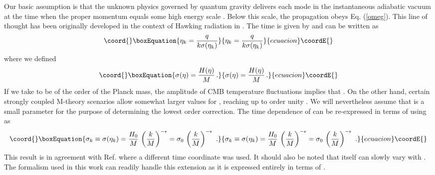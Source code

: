 \documentclass[a4paper,aps,prd,preprint,groupedaddress,nofootinbib]{revtex4}
\begin{document}
Our basic assumption is that the unknown physics governed by quantum gravity
delivers each mode \coordHE{} in the instantaneous
adiabatic vacuum at the time \coordHE{} when the proper momentum \coordHE{} 
equals some high energy scale \coordHE{}. Below this scale, the 
propagation obeys Eq. (\ref{omeg}). This line of thought has been
originally developed in the context of Hawking radiation in \cite{J93}. 
The time \coordHE{} is given by \coordHE{} and can be written as
\begin{equation}\coord{}\boxEquation{
\eta_k = \frac{q}{k \sigma(\eta_k)}
}{
\eta_k = \frac{q}{k \sigma(\eta_k)}
}{ecuacion}\coordE{}\end{equation}
where we defined
\begin{equation}\coord{}\boxEquation{
\label{sigmadef}
\sigma(\eta) = \frac{H(\eta)}{M} \, .
}{
\sigma(\eta) = \frac{H(\eta)}{M} \, .
}{ecuacion}\coordE{}\end{equation}
If we take \coordHE{} to be of the order of the Planck mass, the amplitude of CMB
temperature fluctuations implies that \coordHE{}. On
the other hand, certain strongly coupled M-theory scenarios allow somewhat
larger values for \myHighlight{$\sigma$}\coordHE{}, reaching up to order unity
\cite{Eea01,Kea02}. We will nevertheless assume that \myHighlight{$\sigma$}\coordHE{} is a
small parameter for the purpose of determining the lowest order correction.
The time dependence of \myHighlight{$\sigma$}\coordHE{} can  be re-expressed in terms of \coordHE{} using
\coordHE{} as
\begin{equation}\coord{}\boxEquation{
\label{sigmak}
\sigma_k \equiv \sigma( \eta_k)
= \frac{H_0}{M}\, \left(\frac{k}{M}\right)^{-\epsilon} =
\sigma_0 \, \left(\frac{k}{M}\right)^{-\epsilon}\,\,.
}{
\sigma_k \equiv \sigma( \eta_k)
= \frac{H_0}{M}\, \left(\frac{k}{M}\right)^{-\epsilon} =
\sigma_0 \, \left(\frac{k}{M}\right)^{-\epsilon}\,\,.
}{ecuacion}\coordE{}\end{equation}
This result is in agreement with Ref. \cite{Eea02} where a different
time coordinate was used. It should also be noted that \coordHE{} itself can
slowly vary with \coordHE{}.
The formalism used in this work can readily handle this
extension as it is expressed entirely in terms of \coordHE{}.  
  
\end{document}
